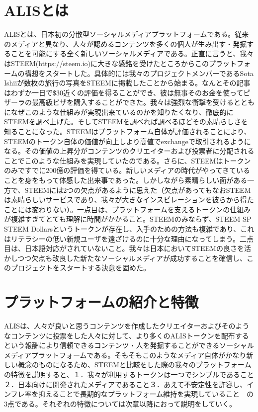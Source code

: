 \documentclass{jsarticle}
\begin{document}
\section{ALISとは}
ALISとは、日本初の分散型ソーシャルメディアプラットフォームである。従来のメディアと異なり、人々が認めるコンテンツを多くの個人が生み出す・発掘することを可能にする全く新しいソーシャルメディアである。正直に言うと、我々はSTEEM(https://steem.io)に大きな感銘を受けたところからこのプラットフォームの構想をスタートした。具体的には我々のプロジェクトメンバーであるSota Ishiiが数枚の旅行の写真をSTEEMに掲載したことから始まる。なんとその記事はわずか一日で\$30近くの評価を得ることができ、彼は無事そのお金を使ってピザーラの最高級ピザを購入することができた。我々は強烈な衝撃を受けるとともになぜこのような仕組みが実現出来ているのかを知りたくなり、徹底的にSTEEMを調べ上げた。そしてSTEEMを調べれば調べるほどその素晴らしさを知ることになった。STEEMはプラットフォーム自体が評価されることにより、STEEMのトークン自体の価値が向上しより高値でexchangeで取引されるようになる。その価値の上昇分がコンテンツのクリエイターおよび投票者に分配されることでこのような仕組みを実現していたのである。さらに、STEEMはトークンのみですでに200億の評価を得ている。新しいメディアの時代がやってきていることを身をもって体感した出来事であった。しかしながら素晴らしい面がある一方で、STEEMには2つの欠点があるように思えた（欠点があってもなおSTEEMは素晴らしいサービスであり、我々が大きなインスピレーションを彼らから得たことには変わりない）。一点目は、プラットフォームを支えるトークンの仕組みが複雑すぎてとても理解に時間がかかること。STEEMのみならず、STEEM SP STEEM Dollarsというトークンが存在し、入手のための方法も複雑であり、これはリテラシーの低い新規ユーザを遠ざけるのに十分な理由になってしまう。二点目は、日本語対応がされていないこと。我々は日本においてSTEEMの良さを活かしつつ欠点も改良した新たなソーシャルメディアが成功することを確信し、このプロジェクトをスタートする決意を固めた。
\section{プラットフォームの紹介と特徴}
ALISは、人々が良いと思うコンテンツを作成したクリエイターおよびそのようなコンテンツに投票をした人々に対して、より多くのALISトークンを配布するという報酬により信頼できるコンテンツ・人を発掘することができるソーシャルメディアプラットフォームである。そもそもこのようなメディア自体がかなり新しい概念のものになるため、STEEMと比較をした際の我々のプラットフォームの特徴を説明すると、１．我々が利用するトークンは一つでシンプルであること２．日本向けに開発されたメディアであること３．あえて不安定性を許容し、インフレ率を抑えることで長期的なプラットフォーム維持を実現していること　の3点である。それぞれの特徴については次章以降におって説明をしていく。
\end{document}
